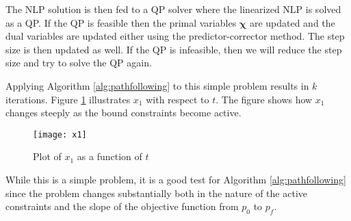 The NLP solution is then fed to a QP solver where the linearized NLP is solved as a QP.
If the QP is feasible then the primal variables $\boldsymbol{\chi}$ are updated and the dual variables are updated either using the predictor-corrector method.
The step size is then updated as well.
If the QP is infeasible, then we will reduce the step size and try to solve the QP again.
\par
Applying Algorithm \ref{alg:pathfollowing} to this simple problem results in $k$ iterations.
Figure \ref{fig:x1} illustrates $x_1$ with respect to $t$.
The figure shows how $x_1$ changes steeply as the bound constraints become active.
\begin{figure}[H]
	\centering
	\texttt{[image: x1]}
	\caption{Plot of $x_1$ as a function of $t$}
   \label{fig:x1}
\end{figure}
While this is a simple problem, it is a good test for Algorithm \ref{alg:pathfollowing} since the problem changes substantially both in the nature of the active constraints and the slope of the objective function from $p_0$ to $p_f$\cite{param}.